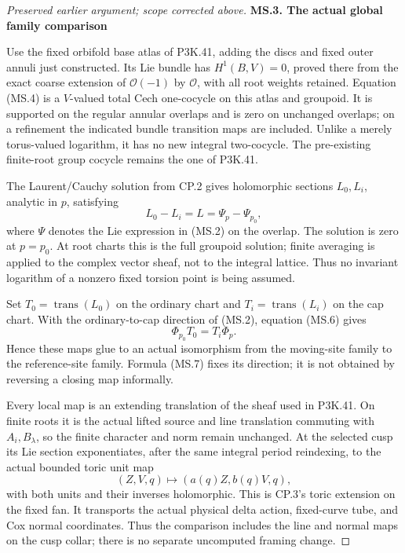 \begin{proof}[Preserved earlier argument; scope corrected above]
\medskip\noindent\textbf{MS.3. The actual global family comparison}

\par\nobreak

Use the fixed orbifold base atlas of P3K.41, adding the discs and fixed
outer annuli just constructed. Its Lie bundle has
\(H^1(B,V)=0\), proved there from the exact coarse extension of
\(\mathcal O(-1)\) by \(\mathcal O\), with all root weights
retained. Equation (MS.4) is a \(V\)-valued total Cech one-cocycle
on this atlas and groupoid. It is supported on the regular annular
overlaps and is zero on unchanged overlaps; on a refinement the
indicated bundle transition maps are included. Unlike a merely
torus-valued logarithm, it has no new integral two-cocycle. The
pre-existing finite-root group cocycle remains the one of P3K.41.

The Laurent/Cauchy solution from CP.2 gives holomorphic sections
\(L_0,L_i\), analytic in \(p\), satisfying
\[
                    L_0-L_i=L=\Psi_p-\Psi_{p_0},          \tag{MS.6}
\]
where \(\Psi\) denotes the Lie expression in (MS.2) on the
overlap. The solution is zero at \(p=p_0\). At root charts this
is the full groupoid solution; finite averaging is applied to the
complex vector sheaf, not to the integral lattice. Thus no invariant
logarithm of a nonzero fixed torsion point is being assumed.

Set \(T_0=\operatorname{trans}(L_0)\) on the ordinary chart and
\(T_i=\operatorname{trans}(L_i)\) on the cap chart. With the
ordinary-to-cap direction of (MS.2), equation (MS.6) gives
\[
                  \Phi_{p_0}T_0=T_i\Phi_p.                \tag{MS.7}
\]
Hence these maps glue to an actual isomorphism from the moving-site
family to the reference-site family. Formula (MS.7) fixes its direction;
it is not obtained by reversing a closing map informally.

Every local map is an extending translation of the sheaf used in
P3K.41. On finite roots it is the actual lifted source and line
translation commuting with \(A_i,B_\lambda\), so the finite
character and norm remain unchanged. At the selected cusp its Lie
section exponentiates, after the same integral period reindexing, to
the actual bounded toric unit map
\[
                 (Z,V,q)\longmapsto(a(q)Z,b(q)V,q),       \tag{MS.8}
\]
with both units and their inverses holomorphic. This is CP.3's
toric extension on the fixed fan. It transports the actual physical
delta action, fixed-curve tube, and Cox normal coordinates. Thus the
comparison includes the line and normal maps on the cusp collar;
there is no separate uncomputed framing change.


\end{proof}

